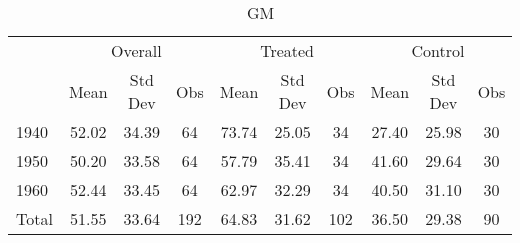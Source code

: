 \begin{table}[htbp]\centering
\def\sym#1{\ifmmode^{#1}\else\(^{#1}\)\fi}
\caption{GM \label{tab1}}
\begin{tabular}{l*{3}{ccc}}
\toprule
                    &\multicolumn{3}{c}{Overall}           &\multicolumn{3}{c}{Treated}           &\multicolumn{3}{c}{Control}           \\
                    &        Mean&     Std Dev&         Obs&        Mean&     Std Dev&         Obs&        Mean&     Std Dev&         Obs\\
\midrule
1940                &       52.02&       34.39&          64&       73.74&       25.05&          34&       27.40&       25.98&          30\\
1950                &       50.20&       33.58&          64&       57.79&       35.41&          34&       41.60&       29.64&          30\\
1960                &       52.44&       33.45&          64&       62.97&       32.29&          34&       40.50&       31.10&          30\\
Total               &       51.55&       33.64&         192&       64.83&       31.62&         102&       36.50&       29.38&          90\\
\bottomrule
\end{tabular}
\end{table}

